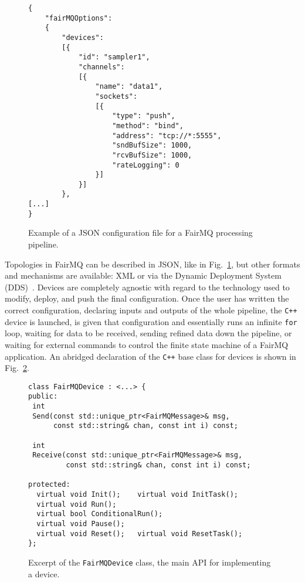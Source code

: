\documentclass{webofc}
\begin{document}
\begin{figure}[h]
\centering
\begin{verbatim}
{
    "fairMQOptions":
    {
        "devices":
        [{
            "id": "sampler1",
            "channels":
			[{
                "name": "data1",
                "sockets":
				[{
                    "type": "push",
                    "method": "bind",
                    "address": "tcp://*:5555",
                    "sndBufSize": 1000,
                    "rcvBufSize": 1000,
                    "rateLogging": 0
                }]
            }]
        },
[...]
}
\end{verbatim}

\caption{Example of a JSON configuration file for a FairMQ processing pipeline.}
\label{fig-cfg-json}       %
\end{figure}

Topologies in FairMQ can be described in JSON, like in Fig.~\ref{fig-cfg-json}, but other formats and mechanisms are available: XML or via the Dynamic Deployment System (DDS)~\cite{ref-dds}.
Devices are completely agnostic with regard to the technology used to modify, deploy, and push the final configuration.
Once the user has written the correct configuration, declaring inputs and outputs of the whole pipeline, the \texttt{C++} device is launched, is given that configuration and essentially runs an infinite \texttt{for} loop, waiting for data to be received, sending refined data down the pipeline, or waiting for external commands to control the finite state machine of a FairMQ application.
An abridged declaration of the \texttt{C++} base class for devices is shown in Fig.~\ref{fig-fairmq-cxx-device}.

\begin{figure}[h]
\centering
\begin{verbatim}
class FairMQDevice : <...> {
public:
 int
 Send(const std::unique_ptr<FairMQMessage>& msg,
      const std::string& chan, const int i) const;

 int
 Receive(const std::unique_ptr<FairMQMessage>& msg,
         const std::string& chan, const int i) const;

protected:
  virtual void Init();    virtual void InitTask();
  virtual void Run();
  virtual bool ConditionalRun();
  virtual void Pause();
  virtual void Reset();   virtual void ResetTask();
};
\end{verbatim}
\caption{Excerpt of the \texttt{FairMQDevice} class, the main API for implementing a device.}
\label{fig-fairmq-cxx-device}
\end{figure}
\end{document}
